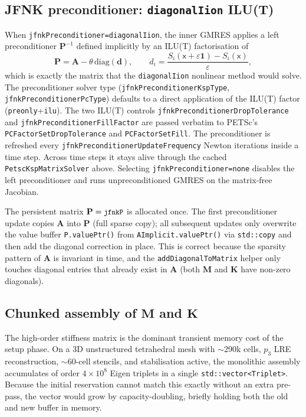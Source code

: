 \documentclass[11pt,a4paper]{article}
\newcommand{\code}[1]{\texttt{\small #1}}
\newcommand{\Mmass}{\mathbf{M}}
\newcommand{\Kstif}{\mathbf{K}}
\newcommand{\Aimp}{\mathbf{A}}
\begin{document}
\subsection{JFNK preconditioner: \texorpdfstring{\code{diagonalIion}}{diagonalIion} ILU(T)}

When \code{jfnkPreconditioner=diagonalIion}, the inner GMRES applies a
left preconditioner $\mathbf{P}^{-1}$ defined implicitly by an ILU(T)
factorisation of
\begin{equation}
  \mathbf{P}
  =
  \Aimp - \theta\,\mathrm{diag}(\mathbf{d}),
  \qquad
  d_i =
  \frac{S_i(\mathsf{x}+\varepsilon\mathbf{1})-S_i(\mathsf{x})}{\varepsilon},
  \label{eq:jfnk-pc-matrix}
\end{equation}
which is exactly the matrix that the \code{diagonalIion} nonlinear method
would solve. The preconditioner solver type (\code{jfnkPreconditionerKspType},
\code{jfnkPreconditionerPcType}) defaults to a direct application of the
ILU(T) factor (\code{preonly}+\code{ilu}). The two ILU(T) controls
\code{jfnkPreconditionerDropTolerance} and
\code{jfnkPreconditionerFillFactor} are passed verbatim to PETSc's
\code{PCFactorSetDropTolerance} and \code{PCFactorSetFill}. The preconditioner
is refreshed every \code{jfnkPreconditionerUpdateFrequency} Newton iterations
inside a time step. Across time steps it stays alive through the cached
\code{PetscKspMatrixSolver} above. Selecting \code{jfnkPreconditioner=none}
disables the left preconditioner and runs unpreconditioned GMRES on the
matrix-free Jacobian.

The persistent matrix $\mathbf{P}=\code{jfnkP}$ is allocated once. The first
preconditioner update copies $\Aimp$ into $\mathbf{P}$ (full sparse copy); all
subsequent updates only overwrite the value buffer
\code{P.valuePtr()} from \code{AImplicit.valuePtr()} via \code{std::copy} and
then add the diagonal correction in place. This is correct because the
sparsity pattern of $\Aimp$ is invariant in time, and the
\code{addDiagonalToMatrix} helper only touches diagonal entries that already
exist in $\Aimp$ (both $\Mmass$ and $\Kstif$ have non-zero diagonals).

\subsection{Chunked assembly of \texorpdfstring{$\Mmass$}{M} and
\texorpdfstring{$\Kstif$}{K}}
\label{sec:chunked-assembly}

The high-order stiffness matrix is the dominant transient memory cost of the
setup phase. On a 3D unstructured tetrahedral mesh with $\sim$290k cells, $p_3$
LRE reconstruction, $\sim$60-cell stencils, and stabilisation active, the
monolithic assembly accumulates of order $4\times 10^8$ Eigen triplets in a
single \code{std::vector<Triplet>}. Because the initial reservation cannot
match this exactly without an extra pre-pass, the vector would grow by
capacity-doubling, briefly holding both the old and new buffer in memory.
\end{document}
